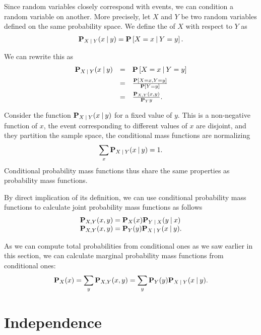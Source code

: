 \begin{gram}
Since random variables closely correspond with events, we can
condition a random variable on another.
%
More precisely, let $X$ and $Y$ be two random variables defined on the
same probability space.
%
We define the  of $X$ with
respect to $Y$ as 
\[
\begin{array}{l}
\mathbf{P}_{X {\:\mid\:} Y}(x {\:\mid\:} y) = \mathbf{P}\left[{X = x {\:\mid\:} Y = y}\right].
\end{array}
\] 

We can rewrite this as 
\[
\begin{array}{lll}
\mathbf{P}_{X {\:\mid\:}{} Y}(x {\:\mid\:}{} y) 
& = & \mathbf{P}\left[{X = x {\:\mid\:}{} Y = y}\right]
\\[2mm]
& = & \frac{\mathbf{P}\left[{X = x, Y = y}\right]}{\mathbf{P}\left[{Y = y}\right]}
\\[2mm]
& = & \frac{\mathbf{P}_{X,Y}(x,y)}{\mathbf{P}_{Y}{y}}.
\end{array}
\] 
\end{gram}

\begin{gram}
Consider the function $\mathbf{P}_{X {\:\mid\:} Y}(x {\:\mid\:} y)$ for a fixed value
of $y$.  This is a non-negative function of $x$, the event
corresponding to different values of $x$ are disjoint, and they
partition the sample space, the conditional mass functions are
normalizing
\[
\sum_{x}{\mathbf{P}_{X {\:\mid\:} Y}(x {\:\mid\:} y)} = 1. 
\]
Conditional probability mass functions thus share the same properties
as probability mass functions.

By direct implication of its definition, we can use conditional
probability mass functions to calculate joint probability mass
functions as follows
\[
\begin{array}{lll}
\mathbf{P}_{X,Y}(x,y) = \mathbf{P}_{X}(x) \mathbf{P}_{Y {\:\mid\:} X}(y {\:\mid\:} x)
\\
\mathbf{P}_{X,Y}(x,y) = \mathbf{P}_{Y}(y) \mathbf{P}_{X {\:\mid\:} Y}(x {\:\mid\:} y).
\end{array}
\]
%

As we can compute total probabilities from conditional ones as we saw
earlier in this section, we can calculate marginal probability
mass functions from conditional ones:
\[
\mathbf{P}_{X}(x) = \sum_{y}{\mathbf{P}_{X,Y}(x,y)} = \sum_{y}{\mathbf{P}_{Y}(y)\mathbf{P}_{X {\:\mid\:} Y}(x {\:\mid\:} y)}.
\]
\end{gram}



\section{Independence}
\label{sec:probability::randvar::independence}

